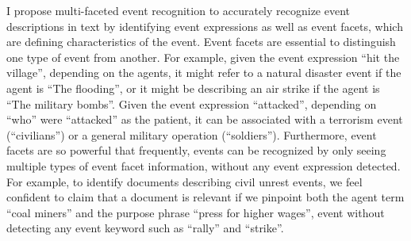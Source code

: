 I propose multi-faceted event recognition to accurately recognize 
event descriptions in text by identifying event
expressions as well as event facets, which are defining characteristics of the event.
Event facets are essential to distinguish one type of event from another. 
For example, given the event expression ``hit the village'', 
depending on the agents, it might refer to a natural disaster event if the agent is ``The flooding'', or 
it might be describing an air strike if the agent is ``The military bombs''. 
Given the event expression ``attacked'', 
depending on ``who'' were ``attacked'' as the patient, 
it can be associated with a terrorism event (``civilians'') 
or a general military operation (``soldiers'').
Furthermore, event facets are so powerful that frequently, 
events can be recognized 
by only seeing multiple types of event facet information, 
without any event expression detected. 
For example, to identify documents describing civil unrest events, 
we feel confident to claim that a document is relevant if we pinpoint both the agent term ``coal miners'' 
and the purpose phrase ``press for higher wages'', event without detecting any event keyword such as 
``rally'' and ``strike''.
